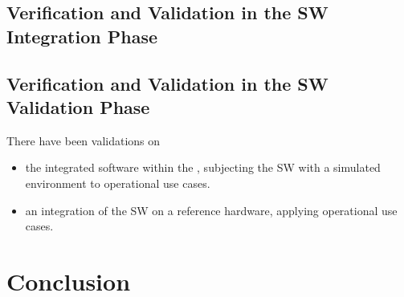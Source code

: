 \documentclass{template/openetcs_article}
\begin{document}

\newpage

\newpage

% 

\newpage
\subsection{Verification and Validation in the SW Integration Phase}
\label{sec:vnv-6}


\subsection{Verification and Validation in the SW Validation Phase}
\label{sec:vnv-7}

There have been validations on
\begin{itemize}
\item the integrated software within the , subjecting the SW with a simulated environment to
  operational use cases.
\item an integration of the SW on a reference hardware, applying
  operational use cases.  
\end{itemize}



\section{Conclusion}
\label{sec:conclusion}








\end{document}
